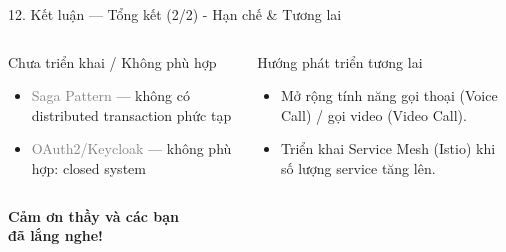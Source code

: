 \documentclass[aspectratio=169,compress]{beamer}
\begin{document}
\begin{frame}{12. Kết luận --- Tổng kết (2/2) - Hạn chế \& Tương lai}
\begin{columns}[T]
\begin{alertblock}{Chưa triển khai / Không phù hợp}
\begin{itemize}
  \item \textcolor{gray}{Saga Pattern} --- không có distributed transaction phức tạp
  \item \textcolor{gray}{OAuth2/Keycloak} --- không phù hợp: closed system
\end{itemize}
\end{alertblock}

\begin{block}{Hướng phát triển tương lai}
\begin{itemize}
  \item Mở rộng tính năng gọi thoại (Voice Call) / gọi video (Video Call).
  \item Triển khai Service Mesh (Istio) khi số lượng service tăng lên.
\end{itemize}
\end{block}
\end{columns}
\end{frame}

\begin{frame}
\centering
\Huge\textbf{Cảm ơn thầy và các bạn\\đã lắng nghe!}
\end{frame}
\end{document}
